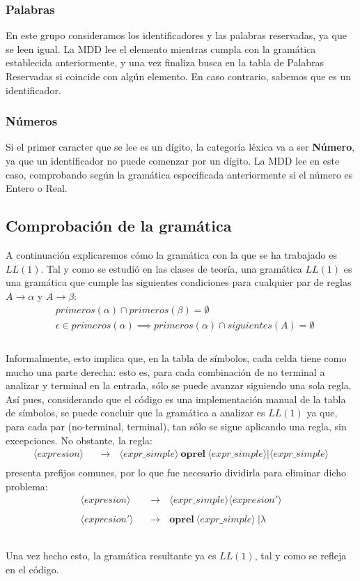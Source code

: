 \documentclass[11pt]{article}
\newcommand{\nt}[1]{\langle#1\rangle}
\newcommand{\regla}[2]{\nt{#1} \ \ \ &\rightarrow \ \ \ #2 \\}
\begin{document}
\subsubsection{Palabras}
En este grupo consideramos los identificadores y las palabras reservadas, ya que se leen igual. La MDD lee el elemento mientras cumpla con la gramática establecida anteriormente, y una vez finaliza busca en la tabla de Palabras Reservadas si coincide con algún elemento. En caso contrario, sabemos que es un identificador. 

\subsubsection{Números}
Si el primer caracter que se lee es un dígito, la categoría léxica va a ser \textbf{Número}, ya que un identificador no puede comenzar por un dígito. La MDD lee en este caso, comprobando según la gramática especificada anteriormente si el número es Entero o Real.

\subsection{Comprobación de la gramática}
A continuación explicaremos cómo la gramática con la que se ha trabajado es $LL(1)$. Tal y como se estudió en las clases de teoría, una gramática $LL(1)$ es una gramática que cumple las siguientes condiciones para cualquier par de reglas $A \rightarrow \alpha$ y $A \rightarrow \beta$:
\begin{align*}
	& primeros(\alpha) \cap primeros(\beta) = \emptyset \\
	& \epsilon \in primeros(\alpha) \implies primeros(\alpha) \cap siguientes(A) = \emptyset\\
\end{align*}
\\
Informalmente, esto implica que, en la tabla de símbolos, cada celda tiene como mucho una parte derecha: esto es, para cada combinación de no terminal a analizar y terminal en la entrada, sólo se puede avanzar siguiendo una sola regla. \\
Así pues, considerando que el código es una implementación manual de la tabla de símbolos, se puede concluir que la gramática a analizar es $LL(1)$ ya que, para cada par (no-terminal, terminal), tan sólo se sigue aplicando una regla, sin excepciones. No obstante, la regla: \begin{align*}
\regla{expresion}{\nt{expr\_simple} \ \textbf{oprel} \ \nt{expr\_simple} | \nt{expr\_simple}}
\end{align*}
presenta prefijos comunes, por lo que fue necesario dividirla para eliminar dicho problema: \begin{align*}
\regla{expresion}{\nt{expr\_simple} \nt{expresion'}} \\
\regla{expresion'}{\textbf{oprel} \ \nt{expr\_simple} \ | \lambda} \\
\end{align*} \\
Una vez hecho esto, la gramática resultante ya es $LL(1)$, tal y como se refleja en el código.
\end{document}
